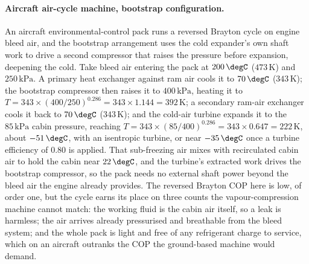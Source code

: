 \paragraph{Aircraft air-cycle machine, bootstrap configuration.} An aircraft
environmental-control pack runs a reversed Brayton cycle on engine bleed air, and
the bootstrap arrangement uses the cold expander's own shaft work to drive a
second compressor that raises the pressure before expansion, deepening the cold.
Take bleed air entering the pack at $200\,\degC$ ($473\,\si{\kelvin}$) and
$250\,\text{kPa}$. A primary heat exchanger against ram air cools it to
$70\,\degC$ ($343\,\si{\kelvin}$); the bootstrap compressor then raises it to
$400\,\text{kPa}$, heating it to $T = 343 \times (400/250)^{0.286} =
343 \times 1.144 = 392\,\si{\kelvin}$; a secondary ram-air exchanger cools it
back to $70\,\degC$ ($343\,\si{\kelvin}$); and the cold-air turbine expands it to
the $85\,\text{kPa}$ cabin pressure, reaching $T = 343 \times (85/400)^{0.286} =
343 \times 0.647 = 222\,\si{\kelvin}$, about $-51\,\degC$, with an isentropic
turbine, or near $-35\,\degC$ once a turbine efficiency of $0.80$ is applied.
That sub-freezing air mixes with recirculated cabin air to hold the cabin near
$22\,\degC$, and the turbine's extracted work drives the bootstrap compressor, so
the pack needs no external shaft power beyond the bleed air the engine already
provides. The reversed Brayton COP here is low, of order one, but the cycle earns
its place on three counts the vapour-compression machine cannot match: the
working fluid is the cabin air itself, so a leak is harmless; the air arrives
already pressurised and breathable from the bleed system; and the whole pack is
light and free of any refrigerant charge to service, which on an aircraft
outranks the COP the ground-based machine would demand.

